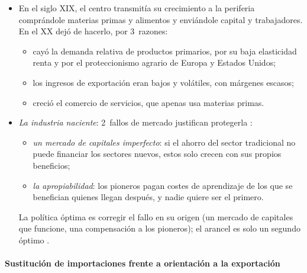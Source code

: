\documentclass[11pt]{article}
\begin{document}
\begin{itemize}
\item En el siglo XIX, el centro transmitía su crecimiento a la periferia comprándole materias primas y alimentos y enviándole capital y trabajadores. En el XX dejó de hacerlo, por 3~razones:
  \begin{itemize}
  \item cayó la demanda relativa de productos primarios, por su baja elasticidad renta y por el proteccionismo agrario de Europa y Estados Unidos;
  \item los ingresos de exportación eran bajos y volátiles, con márgenes escasos;
  \item creció el comercio de servicios, que apenas usa materias primas.
  \end{itemize}
\item \emph{La industria naciente}: 2~fallos de mercado justifican protegerla :
  \begin{itemize}
  \item \emph{un mercado de capitales imperfecto}: si el ahorro del sector tradicional no puede financiar los sectores nuevos, estos solo crecen con sus propios beneficios;
  \item \emph{la apropiabilidad}: los pioneros pagan costes de aprendizaje de los que se benefician quienes llegan después, y nadie quiere ser el primero.
  \end{itemize}
  La política óptima es corregir el fallo en su origen (un mercado de capitales que funcione, una compensación a los pioneros); el arancel es solo un segundo óptimo .
\end{itemize}

\paragraph{Sustitución de importaciones frente a orientación a la exportación}
\end{document}
